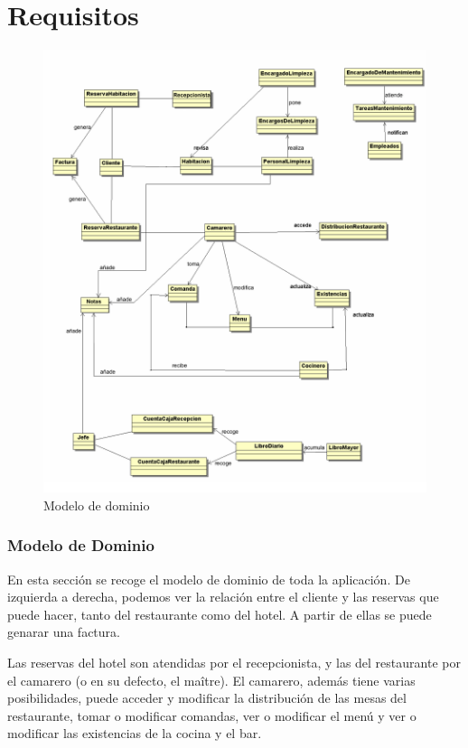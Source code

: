\documentclass[spanish,a4paper,11pt, twoside]{report}	%
\begin{document}
\part{Requisitos}
	\begin{figure}[!h]
	\centering
	\includegraphics[scale=0.5]{modelodedominio.png}
	\vspace{-1.25 true cm}
	\caption{Modelo de dominio}
	\end{figure}	\section{Modelo de Dominio}
	En esta sección se recoge el modelo de dominio de toda la aplicación. De izquierda a derecha, podemos ver la relación entre el cliente y las reservas que puede hacer, tanto del restaurante como del hotel. A partir de ellas se puede genarar una factura. 

	Las reservas del hotel son atendidas por el recepcionista, y las del restaurante por el camarero (o en su defecto, el maître). El camarero, además tiene varias posibilidades, puede acceder y modificar la distribución de las mesas del restaurante, tomar o modificar comandas, ver o modificar el menú y ver o modificar las existencias de la cocina y el bar.
\end{document}
